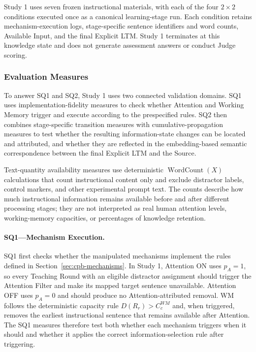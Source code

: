 Study 1 uses seven frozen instructional materials, with each of the four $2\times2$ conditions executed once as a canonical learning-stage run. Each condition retains mechanism-execution logs, stage-specific sentence identifiers and word counts, Available Input, and the final Explicit LTM. Study 1 terminates at this knowledge state and does not generate assessment answers or conduct Judge scoring.

\subsubsection{Evaluation Measures}
\label{subsubsec:study1-measures}

To answer SQ1 and SQ2, Study 1 uses two connected validation domains. SQ1 uses implementation-fidelity measures to check whether Attention and Working Memory trigger and execute according to the prespecified rules. SQ2 then combines stage-specific transition measures with cumulative-propagation measures to test whether the resulting information-state changes can be located and attributed, and whether they are reflected in the embedding-based semantic correspondence between the final Explicit LTM and the Source.

Text-quantity availability measures use deterministic $\operatorname{WordCount}(X)$ calculations that count instructional content only and exclude distractor labels, control markers, and other experimental prompt text. The counts describe how much instructional information remains available before and after different processing stages; they are not interpreted as real human attention levels, working-memory capacities, or percentages of knowledge retention.

\paragraph{SQ1---Mechanism Execution.}

SQ1 first checks whether the manipulated mechanisms implement the rules defined in Section~\ref{sec:cpb-mechanisms}. In Study 1, Attention ON uses $p_A=1$, so every Teaching Round with an eligible distractor assignment should trigger the Attention Filter and make its mapped target sentence unavailable. Attention OFF uses $p_A=0$ and should produce no Attention-attributed removal. WM follows the deterministic capacity rule $D(R_r)>C^{WM}_c$ and, when triggered, removes the earliest instructional sentence that remains available after Attention. The SQ1 measures therefore test both whether each mechanism triggers when it should and whether it applies the correct information-selection rule after triggering.

